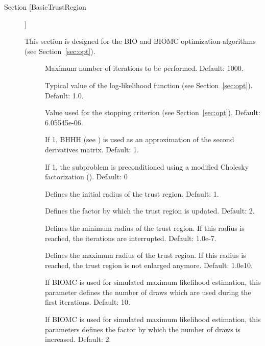 \documentclass[12pt]{memoir}
\begin{document}
\begin{description}
  \item[Section [BasicTrustRegion]]

   This section is designed for the BIO and BIOMC optimization algorithms (see Section~\ref{sec:opt}).
   \begin{description}
      \item[] Maximum number of iterations to be
        performed. Default: 1000.

      \item[] Typical value of the log-likelihood
         function (see Section~\ref{sec:opt}). Default: 1.0.

      \item[] Value used for the stopping criterion
         (see Section~\ref{sec:opt}). Default: 6.05545e-06.

      \item[] If 1,  BHHH (see
         \cite{BernHallHallHaus74}) is used as an approximation of the
         second derivatives matrix. Default: 1.

      \item[] If 1, the subproblem is
         preconditioned using a modified Cholesky factorization
         (\cite{SchnEsko91}). Default: 0

        \item[] Defines the initial radius of
          the trust region. Default: 1.
        \item[] Defines the factor by
          which the trust region is updated. Default: 2. 
\item[] Defines the minimum radius of the
  trust region. If this radius is reached, the iterations are
  interrupted. Default: 1.0e-7.

\item[] Defines the maximum radius of the
  trust region. If this radius is reached, the trust region is not
  enlarged anymore. Default: 1.0e10.

        \item[] If BIOMC is used for
          simulated maximum likelihood estimation, this
          parameter defines the number of draws which are used during
          the first iterations. Default: 10.
        \item[] If BIOMC is used for
          simulated maximum likelihood estimation, this
          parameters defines the factor by which  the number of draws
          is increased. Default: 2.
   \end{description}


\end{description}
\end{document}
